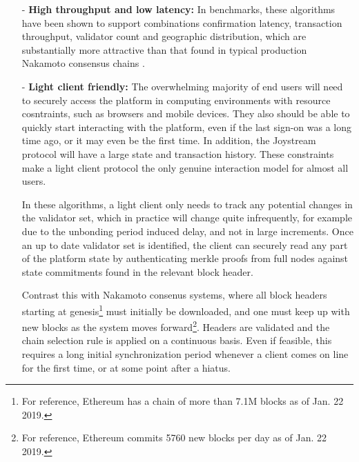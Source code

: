 \documentclass{article}
\begin{document}
\begin{itemize}

    \item[-] \textbf{High throughput and low latency:} In benchmarks, these algorithms have been shown to support combinations confirmation latency, transaction throughput, validator count and geographic distribution, which are substantially more attractive than that found in typical production Nakamoto consensus chains \cite{cosmos}.


    \item[-] \textbf{Light client friendly:} The overwhelming majority of end users will need to securely access the platform in computing environments with resource cosntraints, such as browsers and mobile devices. They also should be able to quickly start interacting with the platform, even if the last sign-on was a long time ago, or it may even be the first time. In addition, the Joystream protocol will have a large state and transaction history. These constraints make a light client protocol the only genuine interaction model for almost all users.

    In these algorithms, a light client only needs to track any potential changes in the validator set, which in practice will change quite infrequently, for example due to the unbonding period induced delay, and not in large increments. Once an up to date validator set is identified, the client can securely read any part of the platform state by authenticating merkle proofs from full nodes against state commitments found in the relevant block header.

    Contrast this with Nakamoto consenus systems, where all block headers starting at genesis\footnote{For reference, Ethereum has a chain of more than 7.1M blocks as of Jan. 22 2019.} must initially be downloaded, and one must keep up with new blocks as the system moves forward\footnote{For reference, Ethereum commits 5760 new blocks per day as of Jan. 22 2019.}. Headers are validated and the chain selection rule is applied on a continuous basis. Even if feasible, this requires a long initial synchronization period whenever a client comes on line for the first time, or at some point after a hiatus.



\end{itemize}
\end{document}
